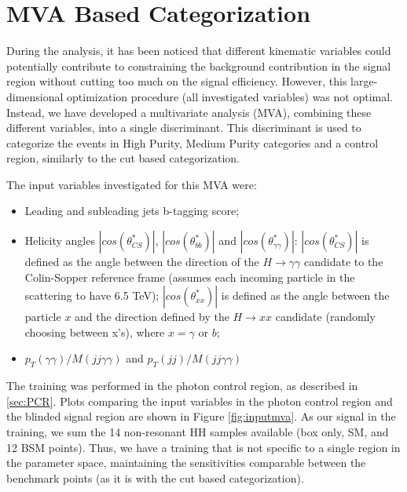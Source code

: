 \section{MVA Based Categorization}
\label{sec:cats}

During the analysis, it has been noticed that different kinematic variables could potentially contribute to constraining the background contribution in the signal region without cutting too much on the signal efficiency. 
However, this large-dimensional optimization procedure (all investigated variables) was not optimal. 
Instead, we have developed a multivariate analysis (MVA), combining these different variables, into a single discriminant. 
This discriminant is used to categorize the events in High Purity, Medium Purity categories and a control region, similarly to the cut based categorization. 

The input variables investigated for this MVA were:
\begin{itemize}
\item Leading and subleading jets b-tagging score;
\item Helicity angles $|cos(\theta^{*}_{CS})|$, $|cos(\theta^{*}_{bb})|$ and $|cos(\theta^{*}_{\gamma\gamma})|$: $|cos(\theta^{*}_{CS})|$ is defined as the angle between the direction of the $H\rightarrow\gamma\gamma$ candidate to the Colin-Sopper reference frame (assumes each incoming particle in the scattering to have 6.5 TeV); $|cos(\theta^{*}_{xx})|$ is defined as the angle between the particle $x$ and the direction defined by the $H\rightarrow x x$ candidate (randomly choosing between x's), where $x = \gamma$ or $b$;
\item $p_{T}(\gamma\gamma)/M(jj\gamma\gamma)$ and $p_{T}(jj)/M(jj\gamma\gamma)$
\end{itemize}

The training was performed in the photon control region, as described in \ref{sec:PCR}. 
Plots comparing the input variables in the photon control region and the blinded signal region are shown in Figure \ref{fig:inputmva}. 
As our signal in the training, we sum the 14 non-resonant HH samples available (box only, SM, and 12 BSM points). 
Thus, we have a training that is not specific to a single region in the parameter space, maintaining the sensitivities comparable between the benchmark points (as it is with the cut based categorization). 

